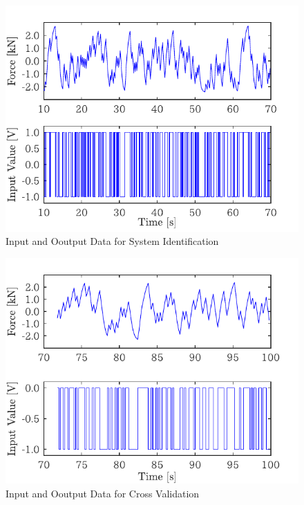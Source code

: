 \begin{figure}[t]
    \centering
        \includegraphics[keepaspectratio, scale=1.0]{contents/SystemIdentification/figure/1018Mseq_inputToFmea_10-70.pdf}
        \caption{Input and Ooutput Data for System Identification}
        \label{fig:1018Mseq_inputToFmea_10-70}
\end{figure}
\begin{figure}[t]
    \centering
        \includegraphics[keepaspectratio, scale=1.0]{contents/SystemIdentification/figure/1018Mseq_inputToFmea_72-100.pdf}
        \caption{Input and Ooutput Data for Cross Validation}
        \label{fig:1018Mseq_inputToFmea_72-100}
\end{figure}
